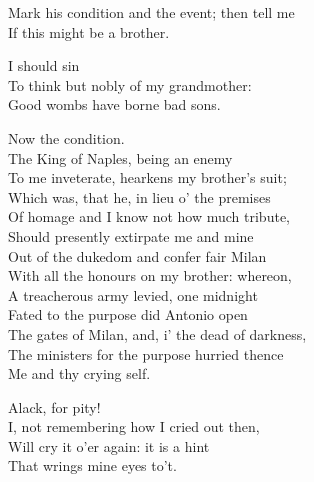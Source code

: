 	
\begin{verse_speech}[Prospero] 
Mark his condition and the event; then tell me\\
If this might be a brother.
\end{verse_speech}

\begin{verse_speech}[Miranda] 
I should sin\\
To think but nobly of my grandmother:\\
Good wombs have borne bad sons.
\end{verse_speech}

\begin{verse_speech}[Prospero] 
Now the condition.\\
The King of Naples, being an enemy\\
To me inveterate, hearkens my brother's suit;\\
Which was, that he, in lieu o' the premises\\
Of homage and I know not how much tribute,\\
Should presently extirpate me and mine\\
Out of the dukedom and confer fair Milan\\
With all the honours on my brother: whereon,\\
A treacherous army levied, one midnight\\
Fated to the purpose did Antonio open\\
The gates of Milan, and, i' the dead of darkness,\\
The ministers for the purpose hurried thence\\
Me and thy crying self.
\end{verse_speech}

\begin{verse_speech}[Miranda] 
Alack, for pity!\\
I, not remembering how I cried out then,\\
Will cry it o'er again: it is a hint\\
That wrings mine eyes to't.
\end{verse_speech}

